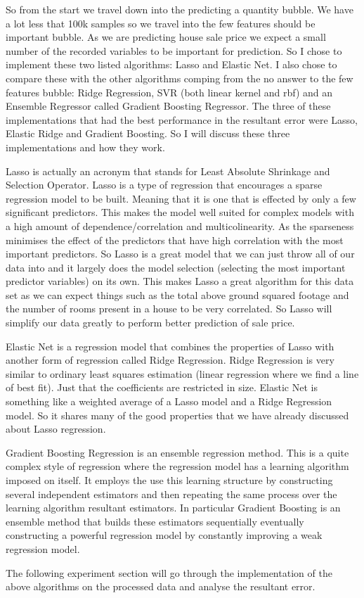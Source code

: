 \documentclass[a4paper]{article}
\begin{document}
    \par So from the start we travel down into the predicting a quantity bubble. We have a lot less that 100k samples so we travel into the few features should be important bubble. As we are predicting house sale price we expect a small number of the recorded variables to be important for prediction. So I chose to implement these two listed algorithms: Lasso and Elastic Net. I also chose to compare these with the other algorithms comping from the no answer to the few features bubble: Ridge Regression, SVR (both linear kernel and rbf) and an Ensemble Regressor called Gradient Boosting Regressor. The three of these implementations that had the best performance in the resultant error were Lasso, Elastic Ridge and Gradient Boosting. So I will discuss these three implementations and how they work.
    \par Lasso is actually an acronym that stands for Least Absolute Shrinkage and Selection Operator. Lasso is a type of regression that encourages a sparse regression model to be built. Meaning that it is one that is effected by only a few significant predictors. This makes the model well suited for complex models with a high amount of dependence/correlation and multicolinearity. As the sparseness minimises the effect of the predictors that have high correlation with the most important predictors. So Lasso is a great model that we can just throw all of our data into and it largely does the model selection (selecting the most important predictor variables) on its own. This makes Lasso a great algorithm for this data set as we can expect things such as the total above ground squared footage and the number of rooms present in a house to be very correlated. So Lasso will simplify our data greatly to perform better prediction of sale price.
    \par Elastic Net is a regression model that combines the properties of Lasso with another form of regression called Ridge Regression. Ridge Regression is very similar to ordinary least squares estimation (linear regression where we find a line of best fit). Just that the coefficients are restricted in size. Elastic Net is something like a weighted average of a Lasso model and a Ridge Regression model. So it shares many of the good properties that we have already discussed about Lasso regression.
    \par Gradient Boosting Regression is an ensemble regression method. This is a quite complex style of regression where the regression model has a learning algorithm imposed on itself. It employs the use this learning structure by constructing several independent estimators and then repeating the same process over the learning algorithm resultant estimators. In particular Gradient Boosting is an ensemble method that builds these estimators sequentially eventually constructing a powerful regression model by constantly improving a weak regression model.
    \par The following experiment section will go through the implementation of the above algorithms on the processed data and analyse the resultant error.
\end{document}
